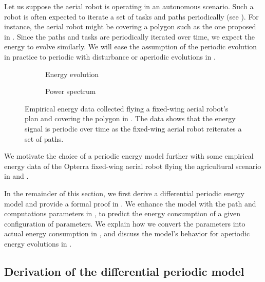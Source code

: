 Let us suppose the aerial robot is operating in an autonomous scenario. Such a robot is often expected to iterate a set of tasks and paths periodically (see ). For instance, the aerial robot might be covering a polygon such as the one proposed in . Since the paths and tasks are periodically iterated over time, we expect the energy to evolve similarly. We will ease the assumption of the periodic evolution in practice to periodic with disturbance or aperiodic evolutions in . 
\begin{figure}[h!]
  \begin{subfigure}[b]{0.52\textwidth}
    \centering
    \footnotesize{}
    
    \caption{Energy evolution}
    \label{fig:energy-1}
  \end{subfigure}\hspace{2mm}
  \begin{subfigure}[b]{0.46\textwidth}
    \centering
    \footnotesize{}
    
    \caption{Power spectrum}
    \label{fig:spectrum-1}
  \end{subfigure}
  \caption[Energy data of a fixed-wing aerial robot]{Empirical energy data collected flying a fixed-wing aerial robot's plan and covering the polygon in . The data shows that the energy signal is periodic over time as the fixed-wing aerial robot reiterates a set of paths.}
\end{figure}
We motivate the choice of a periodic energy model further with some empirical energy data of the Opterra fixed-wing aerial robot flying the agricultural scenario in  and .

In the remainder of this section, we first derive a differential periodic energy model and provide a formal proof in . We enhance the model with the path and computations parameters in , to predict the energy consumption of a given configuration of parameters. We explain how we convert the parameters into actual energy consumption in , and discuss the model's behavior for aperiodic energy evolutions in .

\subsection{Derivation of the differential periodic model}
\label{sec:deriv}

